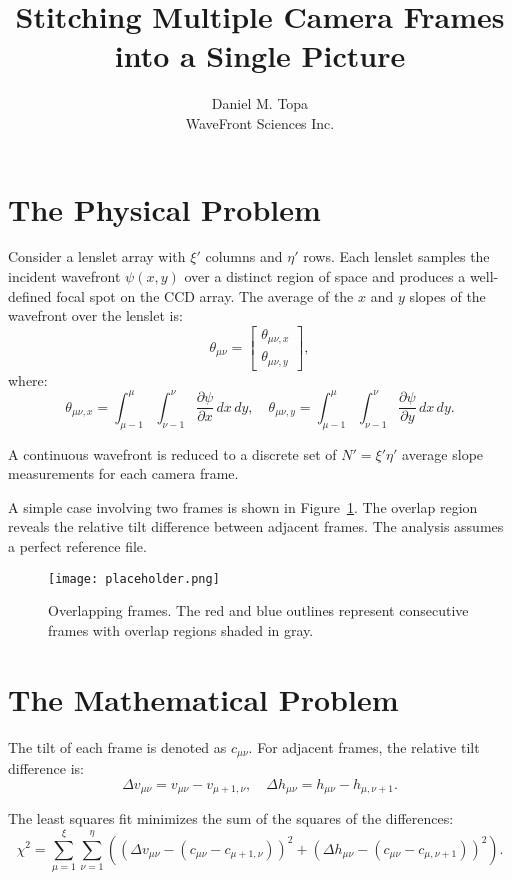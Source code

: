 \documentclass[12pt]{article}
\title{Stitching Multiple Camera Frames into a Single Picture}
\author{Daniel M. Topa \\ WaveFront Sciences Inc.}
\date{}
\begin{document}
\maketitle

\section{The Physical Problem}

Consider a lenslet array with $\xi'$ columns and $\eta'$ rows. Each lenslet samples the incident wavefront $\psi(x, y)$ over a distinct region of space and produces a well-defined focal spot on the CCD array. The average of the $x$ and $y$ slopes of the wavefront over the lenslet is:
\[
\theta_{\mu\nu} = 
\begin{bmatrix}
\theta_{\mu\nu,x} \\
\theta_{\mu\nu,y}
\end{bmatrix},
\]
where:
\[
\theta_{\mu\nu,x} = \int_{\mu-1}^{\mu} \int_{\nu-1}^{\nu} \frac{\partial \psi}{\partial x} \, dx \, dy, \quad
\theta_{\mu\nu,y} = \int_{\mu-1}^{\mu} \int_{\nu-1}^{\nu} \frac{\partial \psi}{\partial y} \, dx \, dy.
\]

A continuous wavefront is reduced to a discrete set of $N' = \xi' \eta'$ average slope measurements for each camera frame.

A simple case involving two frames is shown in Figure~\ref{fig:overlap}. The overlap region reveals the relative tilt difference between adjacent frames. The analysis assumes a perfect reference file.

\begin{figure}[h!]
    \centering
    \texttt{[image: placeholder.png]}
    \caption{Overlapping frames. The red and blue outlines represent consecutive frames with overlap regions shaded in gray.}
    \label{fig:overlap}
\end{figure}

\section{The Mathematical Problem}

The tilt of each frame is denoted as $c_{\mu\nu}$. For adjacent frames, the relative tilt difference is:
\[
\Delta v_{\mu\nu} = v_{\mu\nu} - v_{\mu+1,\nu}, \quad \Delta h_{\mu\nu} = h_{\mu\nu} - h_{\mu,\nu+1}.
\]

The least squares fit minimizes the sum of the squares of the differences:
\[
\chi^2 = \sum_{\mu=1}^\xi \sum_{\nu=1}^\eta 
\left( (\Delta v_{\mu\nu} - (c_{\mu\nu} - c_{\mu+1,\nu}))^2 + (\Delta h_{\mu\nu} - (c_{\mu\nu} - c_{\mu,\nu+1}))^2 \right).
\]
\end{document}
